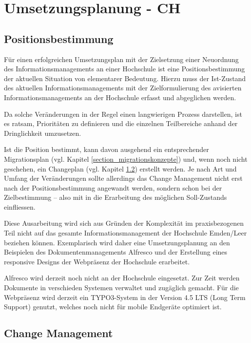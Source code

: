 \section{Umsetzungsplanung - CH}

\subsection{Positionsbestimmung}
Für einen erfolgreichen Umsetzungsplan mit der Zielsetzung einer Neuordnung des Informationsmanagements an einer Hochschule ist eine Positionsbestimmung der aktuellen Situation von elementarer Bedeutung. Hierzu muss der Ist-Zustand des aktuellen Informationsmanagements mit der Zielformulierung des avisierten Informationsmanagements an der Hochschule erfasst und abgeglichen werden. 

Da solche Veränderungen in der Regel einen langwierigen Prozess darstellen, ist es ratsam, Prioritäten zu definieren und die einzelnen Teilbereiche anhand der Dringlichkeit umzusetzen.

Ist die Position bestimmt, kann davon ausgehend ein entsprechender Migrationsplan (vgl. Kapitel \ref{section_migrationskonzepte}) und, wenn noch nicht geschehen, ein Changeplan (vgl. Kapitel \ref{subsection_change_management}) erstellt werden. Je nach Art und Umfang der Veränderungen sollte allerdings das Change Management nicht erst nach der Positionsbestimmung angewandt werden, sondern schon bei der Zielbestimmung – also mit in die Erarbeitung des möglichen Soll-Zustands einfliessen.

Diese Ausarbeitung wird sich aus Gründen der Komplexität im praxisbezogenen Teil nicht auf das gesamte Informationsmanagement der Hochschule Emden/Leer beziehen können. Exemplarisch wird daher eine Umsetzungsplanung an den Beispielen des Dokumentenmanagements Alfresco und der Erstellung eines responsive Designs der Webpräsenz der Hochschule erarbeitet.

Alfresco wird derzeit noch nicht an der Hochschule eingesetzt. Zur Zeit werden Dokumente in verschieden Systemen verwaltet und zugäglich gemacht. Für die Webpräsenz wird derzeit ein TYPO3-System in der Version 4.5 LTS (Long Term Support) genutzt, welches noch nicht für mobile Endgeräte optimiert ist.

\subsection{Change Management}
\label{subsection_change_management}

